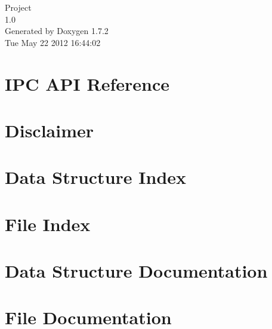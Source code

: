 \documentclass[letterpaper]{article}
\begin{document}
\begin{titlepage}
\vspace*{7cm}
\begin{center}
{\Large Project \\[1ex]\large 1.0 }\\
\vspace*{1cm}
{\large Generated by Doxygen 1.7.2}\\
\vspace*{0.5cm}
{\small Tue May 22 2012 16:44:02}\\
\end{center}
\end{titlepage}
\tableofcontents
{}
\section{IPC API Reference}
\label{index}\hypertarget{index}{}
\section{Disclaimer}
\label{Disclaimer}

\section{Data Structure Index}

\section{File Index}

\section{Data Structure Documentation}















\section{File Documentation}














\printindex
\end{document}
